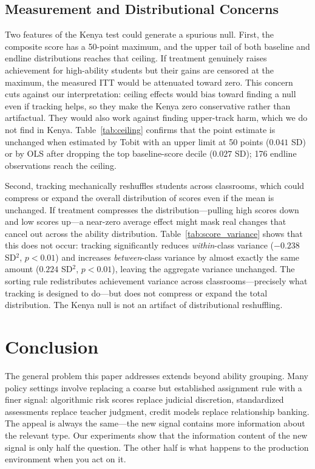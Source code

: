 \documentclass[11pt]{article}
\begin{document}
\subsection{Measurement and Distributional Concerns}

Two features of the Kenya test could generate a spurious null. First, the composite score has a 50-point maximum, and the upper tail of both baseline and endline distributions reaches that ceiling. If treatment genuinely raises achievement for high-ability students but their gains are censored at the maximum, the measured ITT would be attenuated toward zero. This concern cuts against our interpretation: ceiling effects would bias toward finding a null even if tracking helps, so they make the Kenya zero conservative rather than artifactual. They would also work against finding upper-track harm, which we do not find in Kenya. Table~\ref{tab:ceiling} confirms that the point estimate is unchanged when estimated by Tobit with an upper limit at 50 points ($0.041$ SD) or by OLS after dropping the top baseline-score decile ($0.027$ SD); 176 endline observations reach the ceiling.

Second, tracking mechanically reshuffles students across classrooms, which could compress or expand the overall distribution of scores even if the mean is unchanged. If treatment compresses the distribution---pulling high scores down and low scores up---a near-zero average effect might mask real changes that cancel out across the ability distribution. Table~\ref{tab:score_variance} shows that this does not occur: tracking significantly reduces \emph{within}-class variance ($-0.238$ SD$^2$, $p<0.01$) and increases \emph{between}-class variance by almost exactly the same amount ($0.224$ SD$^2$, $p<0.01$), leaving the aggregate variance unchanged. The sorting rule redistributes achievement variance across classrooms---precisely what tracking is designed to do---but does not compress or expand the total distribution. The Kenya null is not an artifact of distributional reshuffling.

\section{Conclusion}
\label{sec:conclusion}

The general problem this paper addresses extends beyond ability grouping. Many policy settings involve replacing a coarse but established assignment rule with a finer signal: algorithmic risk scores replace judicial discretion, standardized assessments replace teacher judgment, credit models replace relationship banking. The appeal is always the same---the new signal contains more information about the relevant type. Our experiments show that the information content of the new signal is only half the question. The other half is what happens to the production environment when you act on it.
\end{document}
